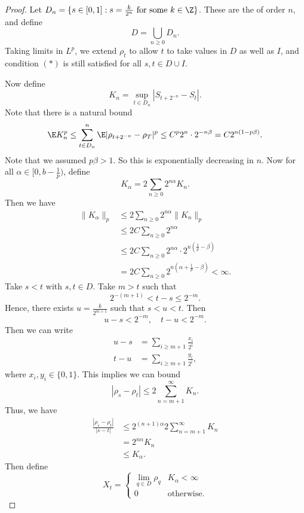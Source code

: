 \documentclass[a4paper]{article}
\begin{document}
\begin{proof}
  Let $D_n = \{s \in [0, 1] : s = \frac{k}{2^n}\text{ for some }k \in \Z\}$. These are the  of order $n$, and define
  \[
    D = \bigcup_{n \geq 0}D_n.
  \]
  Taking limits in $L^p$, we extend $\rho_t$ to allow $t$ to take values in $D$ as well as $I$, and condition $(*)$ is still satisfied for all $s, t \in D \cup I$.

  Now define
  \[
    K_n = \sup_{t \in D_n} |S_{t + 2^{-n}} - S_t|.
  \]
  Note that there is a natural bound
  \[
    \E K_n^p \leq \sum_{t \in D_n}^n \E |\rho_{t + 2^{-n}} - \rho_T|^p \leq C^p 2^n \cdot 2^{-n \beta} = C 2^{n(1 - p\beta)}.
  \]
  Note that we assumed $p\beta > 1$. So this is exponentially decreasing in $n$. Now for all $\alpha \in [0, b - \frac{1}{p})$, define
  \[
    K_\alpha = 2 \sum_{n \geq 0} 2^{n\alpha} K_n.
  \]
  Then we have
  \begin{align*}
    \|K_\alpha\|_p &\leq 2 \sum_{n \geq 0}2^{n\alpha} \|K_n\|_p \\
    &\leq 2C \sum_{n \geq 0} 2^{n\alpha}\\
    &\leq 2C \sum_{n \geq 0} 2^{n\alpha} \cdot 2^{n\left(\frac{1}{p} - \beta\right)}\\
    &= 2C \sum_{n \geq 0} 2^{n(\alpha + \frac{1}{p} - \beta)} < \infty.
  \end{align*}
  Take $s < t$ with $s, t \in D$. Take $m > t$ such that
  \[
    2^{-(m + 1)} < t - s \leq 2^{-m}.
  \]
  Hence, there exists $u = \frac{k}{2^{m + 1}}$ such that $s < u < t$. Then
  \[
    u - s < 2^{-m},\quad t - u < 2^{-m}.
  \]
  Then we can write
  \begin{align*}
    u - s &= \sum_{i \geq m + 1} \frac{x_i}{2^i}\\
    t - u &= \sum_{i \geq m + 1} \frac{y_i}{2^i},
  \end{align*}
  where $x_i, y_i \in \{0, 1\}$. This implies we can bound
  \[
    |\rho_s - \rho_t| \leq 2 \sum_{n = m + 1}^\infty K_n.
  \]
  Thus, we have
  \begin{align*}
    \frac{|\rho_s - \rho_t|}{|s - t|} &\leq 2^{(n + 1)\alpha} 2 \sum_{n = m + 1}^\infty K_n\\
    &= 2^{n\alpha}K_n\\
    &\leq K_\alpha.
  \end{align*}
  Then define
  \[
    X_t = 
    \begin{cases}
      \lim_{q \in D} \rho_q & K_\alpha < \infty\\
      0 & \text{otherwise}.
    \end{cases}
  \]
\end{proof}
\end{document}
